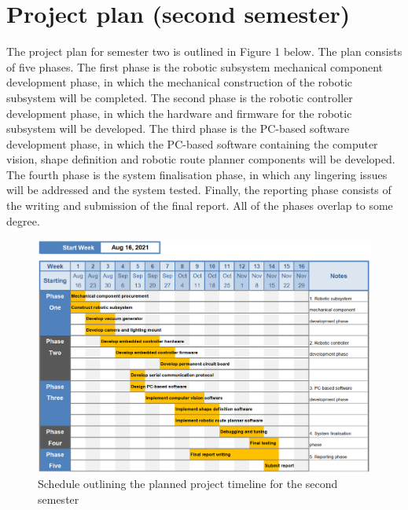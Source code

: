 
\section{Project plan (second semester)}

The project plan for semester two is outlined in Figure 1 below. The plan consists of five phases. The first phase is the robotic subsystem mechanical component development phase, in which the mechanical construction of the robotic subsystem will be completed. The second phase is the robotic controller development phase, in which the hardware and firmware for the robotic subsystem will be developed. The third phase is the PC-based software development phase, in which the PC-based software containing the computer vision, shape definition and robotic route planner components will be developed. The fourth phase is the system finalisation phase, in which any lingering issues will be addressed and the system tested. Finally, the reporting phase consists of the writing and submission of the final report. All of the phases overlap to some degree.

\begin{figure}[!ht]
	\centering
	\includegraphics[width=1\linewidth]{figures/Project Plan Semester 2.PNG}
	\caption{Schedule outlining the planned project timeline for the second semester}
	\label{fig:project_plan}
\end{figure}





